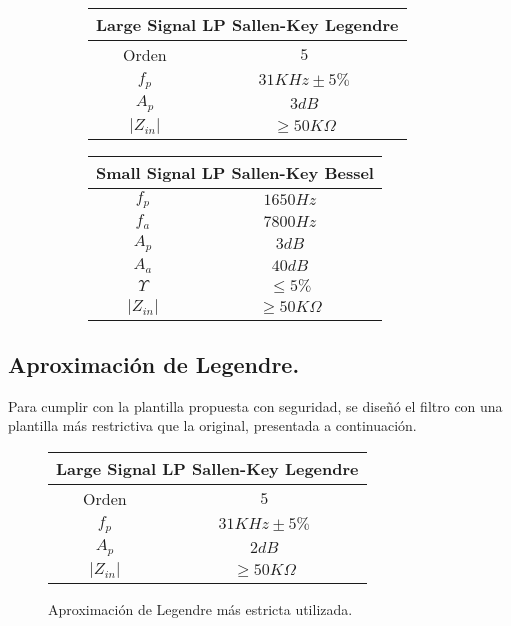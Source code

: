 \begin{figure}[H]
	\begin{subfigure}[t]{0.49\textwidth}
		\begin{table}[H]
			\centering
			\begin{tabular}{@{}cc@{}}
			\toprule
			\multicolumn{2}{c}{Large Signal LP Sallen-Key Legendre} \\ \midrule
			Orden & $5$ \\
			$f_p$ & $31KHz \pm 5\%$ \\
			$A_p$ & $3dB$ \\
			$\left| Z_{in}\right|$ & $\geq 50K\Omega$ \\ \bottomrule
			\end{tabular}
		\end{table}
	\end{subfigure}
	\begin{subfigure}[t]{0.49\textwidth}
		\begin{table}[H]
			\centering	
			\begin{tabular}{@{}cc@{}}
			\toprule
			\multicolumn{2}{c}{Small Signal LP Sallen-Key Bessel} \\ \midrule
			$f_p$ & $1650Hz$ \\
			$f_a$ & $7800Hz$ \\
			$A_p$ & $3dB$ \\
			$A_a$ & $40dB$ \\
			$\Upsilon$ & $\leq 5\%$ \\
			$\left| Z_{in}\right|$ & $\geq 50K\Omega$ \\ \bottomrule
			\end{tabular}
		\end{table}
	\end{subfigure}
\end{figure}
\subsection{Aproximación de Legendre.}

Para cumplir con la plantilla propuesta con seguridad, se diseñó el filtro con una plantilla más restrictiva que la original, presentada a continuación.

\begin{figure}[H]
		\begin{table}[H]
			\centering
			\begin{tabular}{@{}cc@{}}
			\toprule
			\multicolumn{2}{c}{Large Signal LP Sallen-Key Legendre} \\ \midrule
			Orden & $5$ \\
			$f_p$ & $31KHz \pm 5\%$ \\
			$A_p$ & $2dB$ \\
			$\left| Z_{in}\right|$ & $\geq 50K\Omega$ \\ \bottomrule
			\end{tabular}
		\end{table}
		\caption{Aproximación de Legendre más estricta utilizada.}
		\label{aprox_leg_est}
\end{figure}



